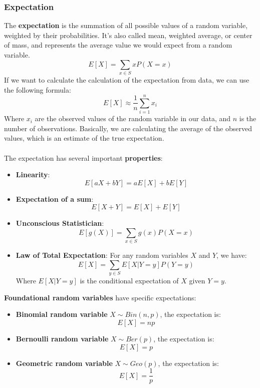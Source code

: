 \subsubsection{Expectation}
The \textbf{expectation} is the summation of all possible values of a random variable, weighted by their probabilities.
It's also called mean, weighted average, or center of mass, and represents the average value we would expect from a random variable.
\begin{equation}
    E[X] = \sum_{x \in S} x P(X=x)
\end{equation}
If we want to calculate the calculation of the expectation from data, we can use the following formula:
\begin{equation}
    E[X] \approx \frac{1}{n} \sum_{i=1}^{n} x_i
\end{equation}
Where $x_i$ are the observed values of the random variable in our data, and $n$ is the number of observations.
Basically, we are calculating the average of the observed values, which is an estimate of the true expectation.
\\\\
The expectation has several important \textbf{properties}:
\begin{itemize}
    \item \textbf{Linearity}: 
    \[
        E[aX + bY] = aE[X] + bE[Y]
    \]
    \item \textbf{Expectation of a sum}: 
        \[
            E[X + Y] = E[X] + E[Y]
        \]
    \item \textbf{Unconscious Statistician}: 
        \[
            E[g(X)] = \sum_{x \in S} g(x) P(X=x)
        \]
    \item \textbf{ Law of Total Expectation}: For any random variables $X$ and $Y$, we have:
        \[
            E[X] = \sum_{y \in S} E[X|Y=y] P(Y=y)
        \]
        Where $E[X|Y=y]$ is the conditional expectation of $X$ given $Y=y$.
\end{itemize}

\textbf{Foundational random variables} have specific expectations:
\begin{itemize}
    \item \textbf{Binomial random variable} $X \sim Bin(n, p)$, the expectation is:
    \[
        E[X] = np
    \]
    \item \textbf{Bernoulli random variable} $X \sim Ber(p)$, the expectation is:
    \[
        E[X] = p
    \]
    \item \textbf{Geometric random variable} $X \sim Geo(p)$, the expectation is:
    \[    
        E[X] = \frac{1}{p}
    \]
\end{itemize}

